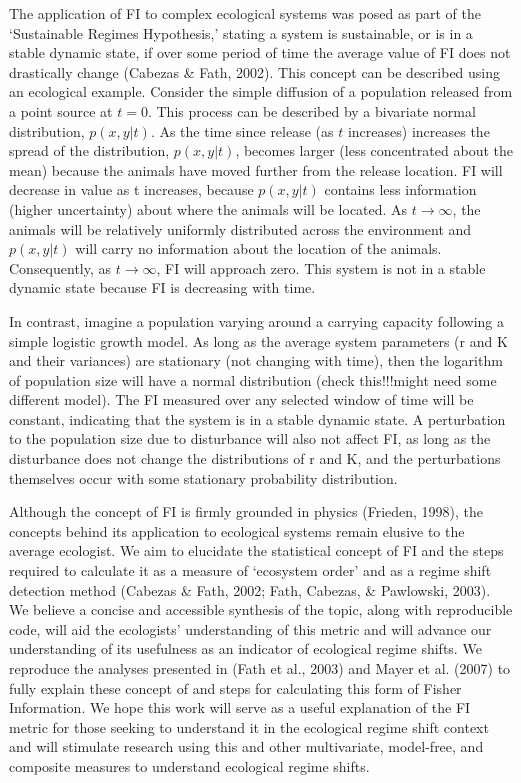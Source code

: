 \documentclass[12pt,twoside,openany]{reedthesis}
\begin{document}
The application of FI to complex ecological systems was posed as part of the `Sustainable Regimes Hypothesis,' stating a system is sustainable, or is in a stable dynamic state, if over some period of time the average value of FI does not drastically change (Cabezas \& Fath, 2002). This concept can be described using an ecological example. Consider the simple diffusion of a population released from a point source at \(t = 0\). This process can be described by a bivariate normal distribution, \(p(x,y\vert t)\). As the time since release (as \(t\) increases) increases the spread of the distribution, \(p(x,y\vert t)\), becomes larger (less concentrated about the mean) because the animals have moved further from the release location. FI will decrease in value as t increases, because \(p(x,y\vert t)\) contains less information (higher uncertainty) about where the animals will be located. As \(t \rightarrow \infty\), the animals will be relatively uniformly distributed across the environment and \(p(x,y\vert t)\) will carry no information about the location of the animals. Consequently, as \(t \rightarrow \infty\), FI will approach zero. This system is not in a stable dynamic state because FI is decreasing with time.

In contrast, imagine a population varying around a carrying capacity following a simple logistic growth model. As long as the average system parameters (r and K and their variances) are stationary (not changing with time), then the logarithm of population size will have a normal distribution (check this!!!might need some different model). The FI measured over any selected window of time will be constant, indicating that the system is in a stable dynamic state. A perturbation to the population size due to disturbance will also not affect FI, as long as the disturbance does not change the distributions of r and K, and the perturbations themselves occur with some stationary probability distribution.

Although the concept of FI is firmly grounded in physics (Frieden, 1998), the concepts behind its application to ecological systems remain elusive to the average ecologist. We aim to elucidate the statistical concept of FI and the steps required to calculate it as a measure of `ecosystem order' and as a regime shift detection method (Cabezas \& Fath, 2002; Fath, Cabezas, \& Pawlowski, 2003). We believe a concise and accessible synthesis of the topic, along with reproducible code, will aid the ecologists' understanding of this metric and will advance our understanding of its usefulness as an indicator of ecological regime shifts. We reproduce the analyses presented in (Fath et al., 2003) and Mayer et al. (2007) to fully explain these concept of and steps for calculating this form of Fisher Information. We hope this work will serve as a useful explanation of the FI metric for those seeking to understand it in the ecological regime shift context and will stimulate research using this and other multivariate, model-free, and composite measures to understand ecological regime shifts.
\end{document}
